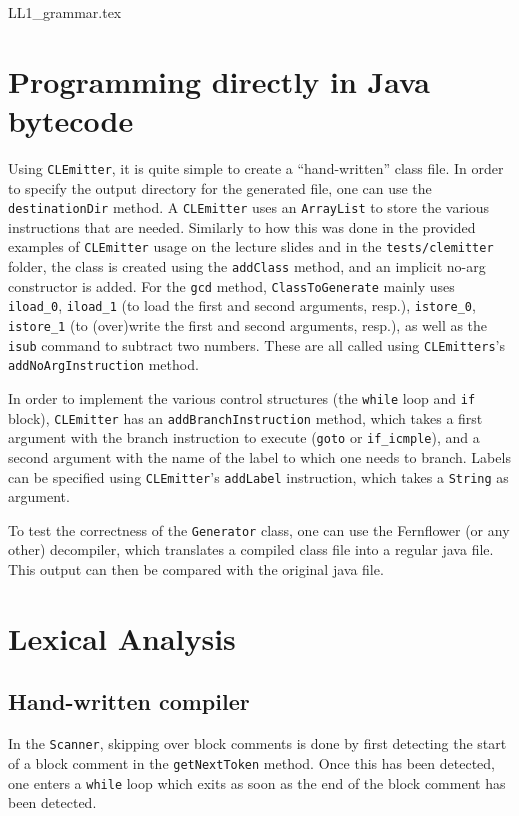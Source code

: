 \documentclass[11pt]{article}
\newcommand{\java}[1]{\texttt{#1}}
\newcommand{\jvm}[1]{\lstinline[style=myjvm]|#1|}
\begin{document}
{LL1_grammar.tex}

\section{Programming directly in Java bytecode}
Using \java{CLEmitter}, it is quite simple to create a ``hand-written'' class file.
In order to specify the output directory for the generated file, one can use the \java{destinationDir} method.
A \java{CLEmitter} uses an \java{ArrayList} to store the various instructions that are needed.
Similarly to how this was done in the provided examples of \java{CLEmitter} usage on the lecture slides and in the \texttt{tests/clemitter} folder, the class is created using the \java{addClass} method, and an implicit no-arg constructor is added.
For the \java{gcd} method, \java{ClassToGenerate} mainly uses \jvm{iload_0}, \jvm{iload_1} (to load the first and second arguments, resp.), \jvm{istore_0}, \jvm{istore_1} (to (over)write the first and second arguments, resp.), as well as the \jvm{isub} command to subtract two numbers.
These are all called using \java{CLEmitters}'s \java{addNoArgInstruction} method.

In order to implement the various control structures (the \java{while} loop and \java{if} block), \java{CLEmitter} has an \java{addBranchInstruction} method, which takes a first argument with the branch instruction to execute (\jvm{goto} or \jvm{if_icmple}), and a second argument with the name of the label to which one needs to branch.
Labels can be specified using \java{CLEmitter}'s \java{addLabel} instruction, which takes a \java{String} as argument.

To test the correctness of the \java{Generator} class, one can use the Fernflower (or any other) decompiler, which translates a compiled class file into a regular java file.
This output can then be compared with the original java file.

\section{Lexical Analysis}
\subsection{Hand-written compiler}
In the \java{Scanner}, skipping over block comments is done by first detecting the start of a block comment in the \java{getNextToken} method.
Once this has been detected, one enters a \java{while} loop which exits as soon as the end of the block comment has been detected.
\end{document}
